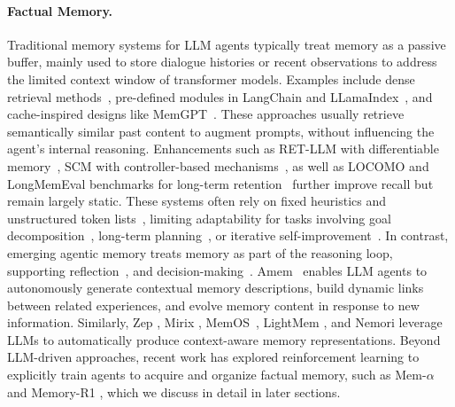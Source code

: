 \paragraph{Factual Memory.} Traditional memory systems for LLM agents typically treat memory as a passive buffer, mainly used to store dialogue histories or recent observations to address the limited context window of transformer models. Examples include dense retrieval methods~\cite{lewis2020retrieval,asaiself,Zhong2023MemoryBankEL}, pre-defined modules in LangChain and LLamaIndex~\cite{Liu_LlamaIndex_2022}, and cache-inspired designs like MemGPT~\cite{Packer2023MemGPTTL}. These approaches usually retrieve semantically similar past content to augment prompts, without influencing the agent’s internal reasoning. Enhancements such as RET-LLM with differentiable memory~\cite{Modarressi2023RETLLMTA}, SCM with controller-based mechanisms~\cite{Liang2023SCMEL}, as well as LOCOMO and LongMemEval benchmarks for long-term retention~\cite{maharana2024evaluating,wu2024longmemeval} further improve recall but remain largely static. These systems often rely on fixed heuristics and unstructured token lists~\cite{Zhong2023MemoryBankEL}, limiting adaptability for tasks involving goal decomposition~\cite{yang-etal-2025-selfgoal, zhang2025atomic}, long-term planning~\cite{zheng2024planagent}, or iterative self-improvement~\cite{Patel2024LargeLM}. In contrast, emerging agentic memory treats memory as part of the reasoning loop, supporting reflection~\cite{bo2024reflective}, and decision-making~\cite{yangyang2023finmem}. Amem~\cite{xu2025mem} enables LLM agents to autonomously generate contextual memory descriptions, build dynamic links between related experiences, and evolve memory content in response to new information. Similarly, Zep \cite{rasmussen2025zep}, Mirix \cite{wang2025mirix}, MemOS~\cite{li2025memos}, LightMem \cite{fang2025lightmem}, and Nemori \cite{nan2025nemori} leverage LLMs to automatically produce context-aware memory representations. Beyond LLM-driven approaches, recent work has explored reinforcement learning to explicitly train agents to acquire and organize factual memory, such as Mem-$\alpha$ \cite{wang2025mem1} and Memory-R1 \cite{yan2025memoryr1}, which we discuss in detail in later sections.


